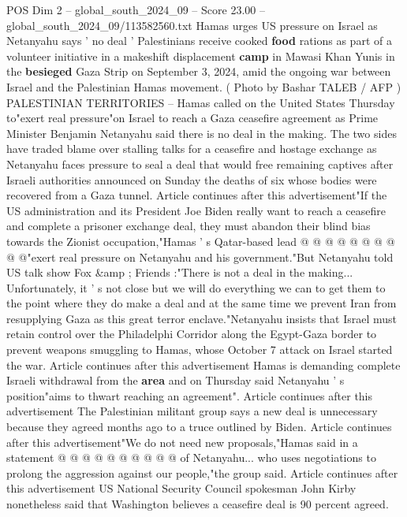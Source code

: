 \begin{textsample}{POS Dim 2 – global\_south\_2024\_09 – Score 23.00 – global\_south\_2024\_09/113582560.txt}  \label{ex:f2_pos_198}
Hamas urges US pressure on Israel as Netanyahu says ' no deal ' Palestinians receive cooked \textbf{food} rations as part of a volunteer initiative in a makeshift displacement \textbf{camp} in Mawasi Khan Yunis in the \textbf{besieged} Gaza Strip on September 3, 2024, amid the ongoing war between Israel and the Palestinian Hamas movement. ( Photo by Bashar TALEB / AFP ) PALESTINIAN TERRITORIES -- Hamas called on the United States Thursday to"exert real pressure"on Israel to reach a Gaza ceasefire agreement as Prime Minister Benjamin Netanyahu said there is no deal in the making.
The two sides have traded blame over stalling talks for a ceasefire and hostage exchange as Netanyahu faces pressure to seal a deal that would free remaining captives after Israeli authorities announced on Sunday the deaths of six whose bodies were recovered from a Gaza tunnel.
Article continues after this advertisement"If the US administration and its President Joe Biden really want to reach a ceasefire and complete a prisoner exchange deal, they must abandon their blind bias towards the Zionist occupation,"Hamas ' s Qatar-based lead @ @ @ @ @ @ @ @ @ @"exert real pressure on Netanyahu and his government."But Netanyahu told US talk show Fox \&amp ; Friends :"There is not a deal in the making...
Unfortunately, it ' s not close but we will do everything we can to get them to the point where they do make a deal and at the same time we prevent Iran from resupplying Gaza as this great terror enclave."Netanyahu insists that Israel must retain control over the Philadelphi Corridor along the Egypt-Gaza border to prevent weapons smuggling to Hamas, whose October 7 attack on Israel started the war.
Article continues after this advertisement Hamas is demanding complete Israeli withdrawal from the \textbf{area} and on Thursday said Netanyahu ' s position"aims to thwart reaching an agreement".
Article continues after this advertisement The Palestinian militant group says a new deal is unnecessary because they agreed months ago to a truce outlined by Biden.
Article continues after this advertisement"We do not need new proposals,"Hamas said in a statement @ @ @ @ @ @ @ @ @ @ of Netanyahu... who uses negotiations to prolong the aggression against our people,"the group said.
Article continues after this advertisement US National Security Council spokesman John Kirby nonetheless said that Washington believes a ceasefire deal is 90 percent agreed.

\end{textsample}
